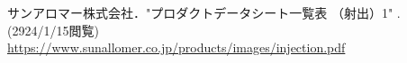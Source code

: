 \begin{thebibliography}{99}
     サンアロマー株式会社．"プロダクトデータシート一覧表 （射出）1" .(2924/1/15閲覧)\\
    \url{https://www.sunallomer.co.jp/products/images/injection.pdf}
\end{thebibliography}
